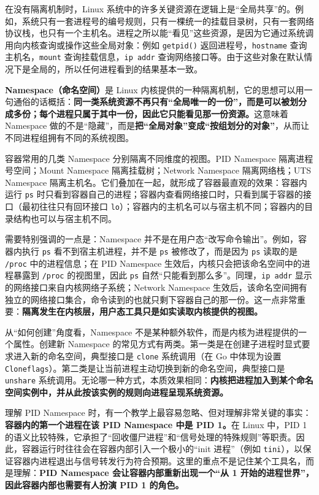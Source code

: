 在没有隔离机制时，Linux 系统中的许多关键资源在逻辑上是“全局共享”的。例如，系统只有一套进程号的编号规则，只有一棵统一的挂载目录树，只有一套网络协议栈，也只有一个主机名。进程之所以能“看见”这些资源，是因为它通过系统调用向内核查询或操作这些全局对象：例如 \texttt{getpid()} 返回进程号，\texttt{hostname} 查询主机名，\texttt{mount} 查询挂载信息，\texttt{ip addr} 查询网络接口等。由于这些对象在默认情况下是全局的，所以任何进程看到的结果基本一致。

\textbf{Namespace（命名空间）}是 Linux 内核提供的一种隔离机制，它的思想可以用一句通俗的话概括：\textbf{同一类系统资源不再只有“全局唯一的一份”，而是可以被划分成多份；每个进程只属于其中一份，因此它只能看见那一份资源。}这意味着 Namespace 做的不是“隐藏”，而是\textbf{把“全局对象”变成“按组划分的对象”}，从而让不同进程组拥有不同的系统视图。

容器常用的几类 Namespace 分别隔离不同维度的视图。PID Namespace 隔离进程号空间；Mount Namespace 隔离挂载树；Network Namespace 隔离网络栈；UTS Namespace 隔离主机名。它们叠加在一起，就形成了容器最直观的效果：容器内运行 \texttt{ps} 时只看到容器自己的进程；容器内查看网络接口时，只看到属于容器的接口（最初往往只有回环接口 \texttt{lo}）；容器内的主机名可以与宿主机不同；容器内的目录结构也可以与宿主机不同。

需要特别强调的一点是：Namespace 并不是在用户态“改写命令输出”。例如，容器内执行 \texttt{ps} 看不到宿主机进程，并不是 \texttt{ps} 被修改了，而是因为 \texttt{ps} 读取的是 \texttt{/proc} 中的进程信息；在 PID Namespace 生效后，内核只会把该命名空间中的进程暴露到 \texttt{/proc} 的视图里，因此 \texttt{ps} 自然“只能看到那么多”。同理，\texttt{ip addr} 显示的网络接口来自内核网络子系统；Network Namespace 生效后，该命名空间拥有独立的网络接口集合，命令读到的也就只剩下容器自己的那一份。这一点非常重要：\textbf{隔离发生在内核层，用户态工具只是如实读取内核提供的视图。}

从“如何创建”角度看，Namespace 不是某种额外软件，而是内核为进程提供的一个属性。创建新 Namespace 的常见方式有两类。第一类是在创建子进程时显式要求进入新的命名空间，典型接口是 \texttt{clone} 系统调用（在 Go 中体现为设置 \texttt{Cloneflags}）。第二类是让当前进程主动切换到新的命名空间，典型接口是 \texttt{unshare} 系统调用。无论哪一种方式，本质效果相同：\textbf{内核把进程加入到某个命名空间实例中，并从此按该实例的规则向进程呈现系统资源。}

理解 PID Namespace 时，有一个教学上最容易忽略、但对理解非常关键的事实：\textbf{容器内的第一个进程在该 PID Namespace 中是 PID 1。}在 Linux 中，PID 1 的语义比较特殊，它承担了“回收僵尸进程”和“信号处理的特殊规则”等职责。因此，容器运行时往往会在容器内部引入一个极小的“init 进程”（例如 \texttt{tini}），以保证容器内进程退出与信号转发行为符合预期。这里的重点不是记住某个工具名，而是理解：\textbf{PID Namespace 会让容器内部重新出现一个“从 1 开始的进程世界”，因此容器内部也需要有人扮演 PID 1 的角色。}

